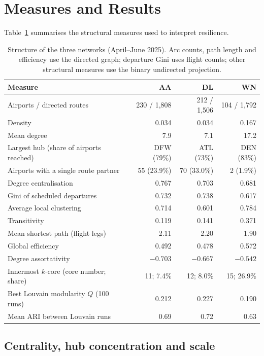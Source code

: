 \documentclass[12pt, a4paper]{article}
\begin{document}
\section{Measures and Results}
\label{measures}

Table~\ref{tab:struct} summarises the structural measures used to interpret resilience.

\begin{table}[!htb]
\centering
\caption{Structure of the three networks (April--June 2025). Arc counts, path length and efficiency use the directed graph; departure Gini uses flight counts; other structural measures use the binary undirected projection.}
\label{tab:struct}
\small
\setlength\tabcolsep{4pt}
\begin{tabular}{p{6.4cm}rrr}
\toprule
Measure & AA & DL & WN \\
\midrule
Airports / directed routes & 230 / 1,808 & 212 / 1,506 & 104 / 1,792 \\
Density & 0.034 & 0.034 & 0.167 \\
Mean degree & 7.9 & 7.1 & 17.2 \\
Largest hub (share of airports reached) & DFW (79\%) & ATL (73\%) & DEN (83\%) \\
Airports with a single route partner & 55 (23.9\%) & 70 (33.0\%) & 2 (1.9\%) \\
Degree centralisation & 0.767 & 0.703 & 0.681 \\
Gini of scheduled departures & 0.732 & 0.738 & 0.617 \\
Average local clustering & 0.714 & 0.601 & 0.784 \\
Transitivity & 0.119 & 0.141 & 0.371 \\
Mean shortest path (flight legs) & 2.11 & 2.20 & 1.90 \\
Global efficiency & 0.492 & 0.478 & 0.572 \\
Degree assortativity & $-0.703$ & $-0.667$ & $-0.542$ \\
Innermost $k$-core (core number; share) & 11; 7.4\% & 12; 8.0\% & 15; 26.9\% \\
Best Louvain modularity $Q$ (100 runs) & 0.212 & 0.227 & 0.190 \\
Mean ARI between Louvain runs & 0.69 & 0.72 & 0.63 \\
\bottomrule
\end{tabular}
\end{table}

\subsection{Centrality, hub concentration and scale}
\end{document}
